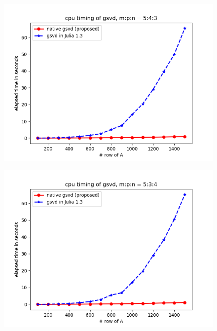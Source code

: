         \begin{figure}[H]
            \centering
            \begin{minipage}{.65\textwidth}
              \centering
              \includegraphics[width=\linewidth]{fig/m_p_n_5_4_3.png}
            \end{minipage}%
        \end{figure}
        
        \begin{figure}[H]
            \centering
            \begin{minipage}{.65\textwidth}
              \centering
              \includegraphics[width=\linewidth]{fig/m_p_n_5_3_4.png}
            \end{minipage}
            \label{cur_new_1}
        \end{figure}
    
